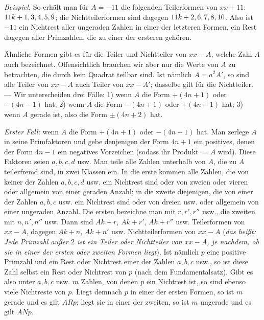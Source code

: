 \textit{Beispiel.} So erhält man für $A=-11$ die folgenden Teilerformen von $xx+11$: $11k+\nobreak{}1,\allowbreak{}3,\allowbreak{}4,\allowbreak{}5,\allowbreak{}9$; die Nichtteilerformen sind dagegen $11k+\nobreak{}2,\allowbreak{}6,\allowbreak{}7,\allowbreak{}8,\allowbreak{}10$. Also ist $-11$ ein Nichtrest aller ungeraden Zahlen in einer der letzteren Formen, ein Rest dagegen aller Primzahlen, die zu einer der ersteren gehören.

Ähnliche Formen gibt es für die Teiler und Nichtteiler von $xx-A$, welche Zahl $A$ auch bezeichnet. Offensichtlich brauchen wir aber nur die Werte von $A$ zu betrachten, die durch kein Quadrat teilbar sind. Ist nämlich $A=a^2A'$, so sind alle Teiler von $xx-A$ auch Teiler von $xx-A'$; dasselbe gilt für die Nichtteiler. --- Wir unterscheiden drei Fälle: 1) wenn $A$ die Form $+(4n+1)$ oder $-(4n-1)$ hat; 2) wenn $A$ die Form $-(4n+1)$ oder $+(4n-1)$ hat; 3) wenn $A$ gerade ist, also die Form $\pm(4n+2)$ hat.

\textit{Erster Fall:} wenn $A$ die Form $+(4n+1)$ oder $-(4n-1)$ hat. Man zerlege $A$ in seine Primfaktoren und gebe denjenigen der Form $4n+1$ ein positives, denen der Form $4n-1$ ein negatives Vorzeichen (sodass ihr Produkt $=A$ wird). Diese Faktoren seien $a,b,c,d$ usw. Man teile alle Zahlen unterhalb von $A$, die zu $A$ teilerfremd sind, in zwei Klassen ein. In die erste kommen alle Zahlen, die von keiner der Zahlen $a,b,c,d$ usw. ein Nichtrest sind oder von zweien oder vieren oder allgemein von einer geraden Anzahl; in die zweite diejenigen, die von einer der Zahlen $a,b,c$ usw. ein Nichtrest sind oder von dreien usw. oder allgemein von einer ungeraden Anzahl. Die ersten bezeichne man mit $r,r',r''$ usw., die zweiten mit $n,n',n''$ usw. Dann sind $Ak+r$, $Ak+r'$, $Ak+r''$ usw. Teilerformen von $xx-A$, dagegen $Ak+n$, $Ak+n'$ usw. Nichtteilerformen von $xx-A$ (\textit{das heißt: Jede Primzahl außer $2$ ist ein Teiler oder Nichtteiler von $xx-A$, je nachdem, ob sie in einer der ersten oder zweiten Formen liegt}). Ist nämlich $p$ eine positive Primzahl und ein Rest oder Nichtrest einer der Zahlen $a,b,c$ usw., so ist diese Zahl selbst ein Rest oder Nichtrest von $p$ (nach dem Fundamentalsatz). Gibt es also unter $a,b,c$ usw. $m$ Zahlen, von denen $p$ ein Nichtrest ist, so sind ebenso viele Nichtreste von $p$. Liegt demnach $p$ in einer der ersten Formen, so ist $m$ gerade und es gilt $ARp$; liegt sie in einer der zweiten, so ist $m$ ungerade und es gilt $ANp$.


